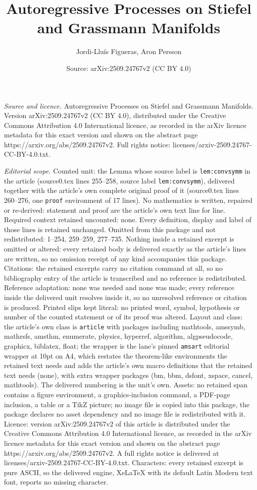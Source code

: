 \documentclass[10pt,a4paper]{amsart}
\title[Autoregressive Processes on Stiefel and Grassmann Manifolds]{Autoregressive Processes on Stiefel and Grassmann Manifolds}
\author{Jordi-Llu\'is Figueras, Aron Persson}
\date{Source: arXiv:2509.24767v2 (CC BY 4.0)}
\begin{document}
\maketitle

\noindent\emph{Source and licence.} Autoregressive Processes on Stiefel and Grassmann Manifolds. Version arXiv:2509.24767v2 (CC BY 4.0), distributed under the Creative Commons Attribution 4.0 International licence, as recorded in the arXiv licence metadata for this exact version and shown on the abstract page https://arxiv.org/abs/2509.24767v2. Full rights notice: licenses/arxiv-2509.24767-CC-BY-4.0.txt.\par\smallskip

\noindent\textit{Editorial scope.} Counted unit: the Lemma whose source label is \texttt{lem:convsymm} in the article (source0.tex lines 255--258, source label \texttt{lem:convsymm}), delivered together with the article's own complete original proof of it (source0.tex lines 260--276, one \texttt{proof} environment of 17 lines). No mathematics is written, repaired or re-derived: statement and proof are the article's own text line for line. Required context retained uncounted: none. Every definition, display and label of those lines is retained unchanged. Omitted from this package and not redistributed: 1--254, 259--259, 277--735. Nothing inside a retained excerpt is omitted or altered: every retained body is delivered exactly as the article's lines are written, so no omission receipt of any kind accompanies this package. Citations: the retained excerpts carry no citation command at all, so no bibliography entry of the article is transcribed and no reference is redistributed. Reference adaptation: none was needed and none was made; every reference inside the delivered unit resolves inside it, so no unresolved reference or citation is produced. Printed slips kept literal: no printed word, symbol, hypothesis or number of the counted statement or of its proof was altered. Layout and class: the article's own class is \texttt{article} with packages including mathtools, amssymb, mathrsfs, amsthm, enumerate, physics, hyperref, algorithm, algpseudocode, graphicx, biblatex, float; the wrapper is the lane's pinned \texttt{amsart} editorial wrapper at 10pt on A4, which restates the theorem-like environments the retained text needs and adds the article's own macro definitions that the retained text needs (none), with extra wrapper packages (bm, bbm, dsfont, xspace, cancel, mathtools). The delivered numbering is the unit's own. Assets: no retained span contains a figure environment, a graphics-inclusion command, a PDF-page inclusion, a table or a TikZ picture; no image file is copied into this package, the package declares no asset dependency and no image file is redistributed with it. Licence: version arXiv:2509.24767v2 of this article is distributed under the Creative Commons Attribution 4.0 International licence, as recorded in the arXiv licence metadata for this exact version and shown on the abstract page https://arxiv.org/abs/2509.24767v2. A full rights notice is delivered at licenses/arxiv-2509.24767-CC-BY-4.0.txt. Characters: every retained excerpt is pure ASCII, so the delivered engine, XeLaTeX with its default Latin Modern text font, reports no missing character.
\end{document}
